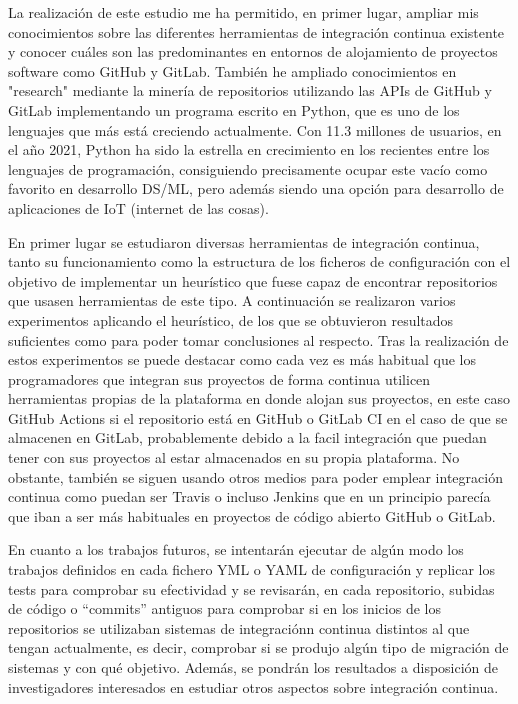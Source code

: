 La realización de este estudio me ha permitido, en primer lugar, ampliar mis conocimientos sobre las diferentes herramientas de integración continua existente y conocer cuáles son las predominantes en entornos de alojamiento de proyectos software como GitHub y GitLab.
También he ampliado conocimientos en "research" mediante la minería de repositorios utilizando las APIs de GitHub y GitLab implementando un programa escrito en Python, que es uno de los lenguajes que más está creciendo actualmente. 
Con 11.3 millones de usuarios, en el año 2021, Python ha sido la estrella en crecimiento en los recientes entre los lenguajes de programación, consiguiendo precisamente ocupar este vacío como favorito en desarrollo DS/ML, pero además siendo una opción para desarrollo de aplicaciones de IoT (internet de las cosas).

En primer lugar se estudiaron diversas herramientas de integración continua, tanto su funcionamiento como la estructura de los ficheros de configuración con el objetivo de implementar un heurístico que fuese capaz de encontrar repositorios que usasen herramientas de este tipo.
A continuación se realizaron varios experimentos aplicando el heurístico, de los que se obtuvieron resultados suficientes como para poder tomar conclusiones al respecto.
Tras la realización de estos experimentos se puede destacar como cada vez es más habitual que los programadores que integran sus proyectos de forma continua utilicen herramientas propias de la plataforma en donde alojan sus proyectos, en este caso GitHub Actions si el repositorio está en GitHub o GitLab CI en el caso de que se almacenen en GitLab, probablemente debido a la facil integración que puedan tener con sus proyectos al estar almacenados en su propia plataforma.
No obstante, también se siguen usando otros medios para poder emplear integración continua como puedan ser Travis o incluso Jenkins que en un principio parecía que iban a ser más habituales en proyectos de código abierto GitHub o GitLab.

En cuanto a los trabajos futuros, se intentarán ejecutar de algún modo los trabajos definidos en cada fichero YML o YAML de configuración y replicar los tests para comprobar su efectividad y se revisarán, en cada repositorio, subidas de código o ``commits'' antiguos para comprobar si en los inicios de los repositorios se utilizaban sistemas de integraciónn continua distintos al que tengan actualmente, es decir, comprobar si se produjo algún tipo de migración de sistemas y con qué objetivo. Además, se pondrán los resultados a disposición de investigadores interesados en estudiar otros aspectos sobre integración continua.
